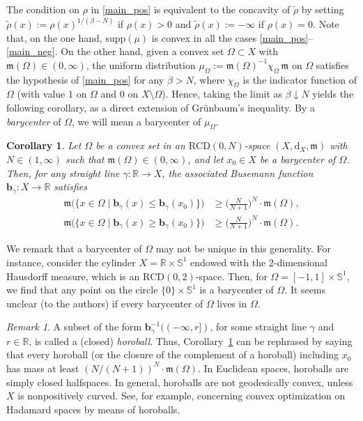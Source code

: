 \documentclass[sts]{imsart}
\newtheorem{corollary}[theorem]{Corollary}
\theoremstyle{definition}
\theoremstyle{remark}
\newtheorem{remark}[theorem]{Remark}
\newcommand{\R}{\mathbb{R}}
\newcommand{\Sph}{\mathbb{S}}
\newcommand{\bb}{\mathbf{b}}
\newcommand{\fm}{\mathfrak{m}}
\newcommand{\dist}{\mathrm{d}}
\newcommand{\lra}{\longrightarrow}
\newcommand{\RCD}{\mathrm{RCD}}
\newcommand{\supp}{\mathrm{supp}}
\newcommand{\veb}[1]{\textcolor{blue}{\textbf{VEB:}  #1}}
\begin{document}
The condition on $\rho$ in \eqref{main_pos} is equivalent to the concavity of $\tilde{\rho}$ by setting $\tilde{\rho}(x):=\rho(x)^{1/(\beta -N)}$ if $\rho(x)>0$ and $\tilde{\rho}(x):=-\infty$ if $\rho(x)=0$.
Note that, on the one hand, $\supp(\mu)$ is convex in all the cases \eqref{main_pos}--\eqref{main_neg}.
On the other hand, given a convex set $\Omega\subset X$ with $\fm(\Omega) \in (0,\infty)$, the uniform distribution $\mu_{\Omega} :=\fm(\Omega)^{-1} \chi_\Omega \,\fm$ on $\Omega$ satisfies the hypothesis of \eqref{main_pos} for any $\beta>N$, where $\chi_\Omega$ is the indicator function of $\Omega$ (with value $1$ on $\Omega$ and $0$ on $X \setminus \Omega$).
Hence, taking the limit as $\beta \downarrow N$ yields the following corollary, as a direct extension of Gr\"{u}nbaum's inequality.
By a \emph{barycenter} of $\Omega$, we will mean a barycenter of $\mu_{\Omega}$.

\begin{corollary}\label{cr:main}
Let $\Omega$ be a convex set in an $\RCD(0,N)$-space $(X,\dist_X,\fm)$ with $N \in (1,\infty)$ such that $\fm(\Omega) \in (0,\infty)$,
and let $x_0 \in X$ be a barycenter of $\Omega$.
Then, for any straight line $\gamma\colon \R \lra X$,
the associated Busemann function $\bb_{\gamma}\colon X \lra \R$ satisfies
\begin{align*}
\fm \bigl( \{ x \in \Omega \mid \bb_{\gamma}(x) \le \bb_{\gamma}(x_0) \} \bigr)
&\ge \biggl( \frac{N}{N+1} \biggr)^N \cdot \fm(\Omega), \\
\fm \bigl( \{ x \in \Omega \mid \bb_{\gamma}(x) \ge \bb_{\gamma}(x_0) \} \bigr)
&\ge \biggl( \frac{N}{N+1} \biggr)^N \cdot \fm(\Omega).
\end{align*}
\end{corollary}

We remark that a barycenter of $\Omega$ may not be unique in this generality.
For instance, consider the cylinder $X=\R \times \Sph^1$ endowed with the $2$-dimensional Hausdorff measure, which is an $\RCD(0,2)$-space.
Then, for $\Omega=[-1,1] \times \Sph^1$, we find that any point on the circle $\{0\} \times \Sph^1$ is a barycenter of $\Omega$.
It seems unclear (to the authors) if every barycenter of $\Omega$ lives in $\Omega$.

\begin{remark}\label{rm:horo}
A subset of the form $\bb_\gamma^{-1}((-\infty,r])$, for some straight line $\gamma$ and $r \in \R$, is called a (closed) \emph{horoball}.
Thus, Corollary~\ref{cr:main} can be rephrased by saying that every horoball (or the closure of the complement of a horoball) including $x_0$ has mass at least $(N/(N+1))^N \cdot \fm(\Omega)$.
In Euclidean spaces, horoballs are simply closed halfspaces.
In general, horoballs are not geodesically convex, unless $X$ is nonpositively curved.
See, for example, \cite{LLN} concerning convex optimization on Hadamard spaces by means of horoballs.
\end{remark}
\end{document}
